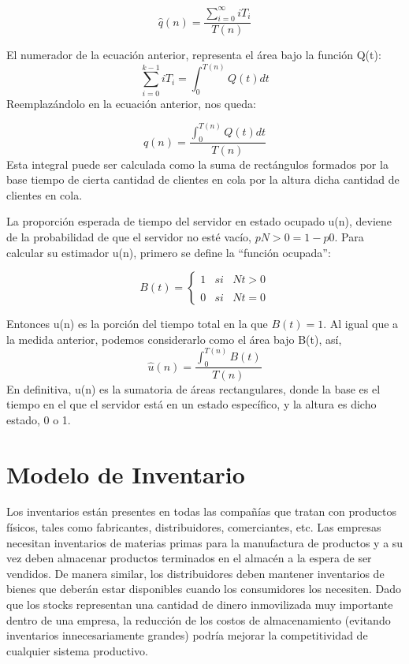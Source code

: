 \begin{equation}
  \label{eq:equation4}
\hat{q}(n)=\frac{\sum_{i=0}^{\infty}iT_{i} }{T(n)}
\end{equation}

El numerador de la ecuación anterior, representa el área bajo la función Q(t):
\begin{equation}
  \label{eq:equation5}
  \sum_{i=0}^{k-1}iT_{i} = \int_{0}^{T(n)}Q(t)dt
\end{equation}
Reemplazándolo en la ecuación anterior, nos queda:

\begin{equation}
  \label{eq:equation6}
  \hat{q}(n)=\frac{\int_{0}^{T(n)}Q(t)dt }{T(n)}
\end{equation}
Esta integral puede ser calculada como la suma de rectángulos formados por la base tiempo de cierta cantidad
de clientes en cola por la altura dicha cantidad de clientes en cola.

La proporción esperada de tiempo del servidor en estado ocupado u(n), deviene de la probabilidad de que
el servidor no esté vacío, $pN > 0 = 1 - p0$. Para calcular su estimador u(n), primero se define la ``función
ocupada'':

\begin{equation}\label{eq:equation7}
  B(t) = \left\{ \begin{array}{lcc}
                  1 &   si  & Nt>0  \\
                  \\ 0 &  si  & Nt=0
  \end{array}
  \right.
\end{equation}

Entonces u(n) es la porción del tiempo total en la que $B(t) = 1$.
Al igual que a la medida anterior, podemos considerarlo como el área bajo B(t), así,
\begin{equation}\label{eq:equation8}
\hat{u}(n)=\frac{\int_{0}^{T(n)}B(t)}{T(n)}
\end{equation}
En definitiva, u(n) es la sumatoria de áreas rectangulares, donde la base es el tiempo en el que el servidor
está en un estado específico, y la altura es dicho estado, 0 o 1.

\section{Modelo de Inventario}\label{sec:modelo-m/m/c}
Los inventarios están presentes en todas las compañías que tratan con productos físicos,
tales como fabricantes, distribuidores, comerciantes, etc.
Las empresas necesitan inventarios de materias primas para la manufactura de productos y a su vez
deben almacenar productos terminados en el almacén a la espera de ser vendidos.
De manera similar, los distribuidores deben mantener inventarios de bienes que deberán estar
disponibles cuando los consumidores los necesiten.
Dado que los stocks representan una cantidad de dinero inmovilizada muy importante dentro
de una empresa, la reducción de los costos de almacenamiento (evitando inventarios
innecesariamente grandes) podría mejorar la competitividad de cualquier sistema
productivo.

